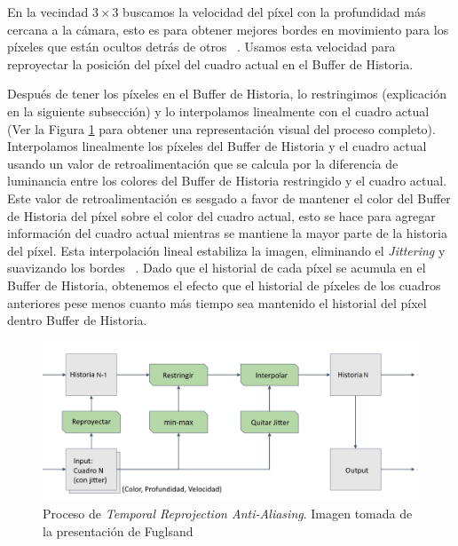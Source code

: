 \documentclass[pregrado]{tesis-usb} %
\begin{document}
En la vecindad $3\times 3$ buscamos la velocidad del píxel con la profundidad más cercana a la cámara, esto es para obtener mejores bordes en movimiento para los píxeles que están ocultos detrás de otros ~\cite{Fuglsand2016}. Usamos esta velocidad para reproyectar la posición del píxel del cuadro actual en el Buffer de Historia. ~\cite{Fuglsand2016, XU2016}

Después de tener los píxeles en el Buffer de Historia, lo restringimos (explicación en la siguiente subsección) y lo interpolamos linealmente con el cuadro actual (Ver la Figura \ref{fig:samplingprocess} para obtener una representación visual del proceso completo). Interpolamos linealmente los píxeles del Buffer de Historia y el cuadro actual usando un valor de retroalimentación que se calcula por la diferencia de luminancia entre los colores del Buffer de Historia restringido y el cuadro actual. Este valor de retroalimentación es sesgado a favor de mantener el color del Buffer de Historia del píxel sobre el color del cuadro actual, esto se hace para agregar información del cuadro actual mientras se mantiene la mayor parte de la historia del píxel. Esta interpolación lineal estabiliza la imagen, eliminando el \textit{Jittering} y suavizando los bordes ~\cite{Fuglsand2016, XU2016}. Dado que el historial de cada píxel se acumula en el Buffer de Historia, obtenemos el efecto que el historial de píxeles de los cuadros anteriores pese menos cuanto más tiempo sea mantenido el historial del píxel dentro Buffer de Historia. ~\cite{Fuglsand2016}

\begin{figure}[H]
	\centering
	\includegraphics[scale=0.4]{images/sampling_process.png}
	\caption{Proceso de \textit{Temporal Reprojection Anti-Aliasing}. Imagen tomada de la presentación de Fuglsand \protect\cite{Fuglsand2016}}\label{fig:samplingprocess}
\end{figure}
\end{document}
